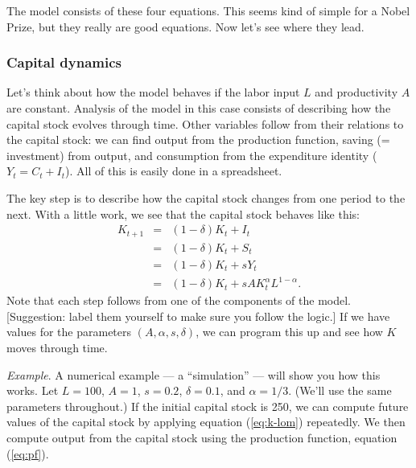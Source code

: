 \documentclass[letterpaper,12pt]{article}
\begin{document}
The model consists of these four equations.
This seems kind of simple for a Nobel Prize, but they really are good equations.
Now let's see where they lead.


\subsubsection*{Capital dynamics}
%
Let's think about how the model behaves if the labor input $L$
and productivity $A$ are constant.
Analysis of the model in this case consists of describing
how the capital stock evolves through time.
Other variables follow from their relations to the capital stock:
we can find output from the production function,
saving (= investment) from output,
and consumption from the expenditure identity ($ Y_t = C_t + I_t$).
All of this is easily done in a spreadsheet.

The key step is to describe how the capital stock changes from one period to the next.
With a little work, we see that the capital stock behaves like this:
\begin{eqnarray}
    K_{t+1} &=& (1-\delta) K_t + I_t \nonumber \\
            &=& (1-\delta) K_t + S_t \nonumber  \\
            &=& (1-\delta) K_t + s Y_t \nonumber \\
            &=& (1-\delta) K_t + s A K_t^\alpha L^{1-\alpha} .
            \label{eq:k-lom}
\end{eqnarray}
Note that each step follows from one of the components of the model.
[Suggestion:  label them yourself
to make sure you follow the logic.]
If we have values for the parameters $(A,\alpha,s,\delta)$,
we can program this up and see how $K$ moves through time.


{\it Example\/}. A numerical example --- a ``simulation'' ---
will show you how this works.
Let $L = 100$, $ A = 1$, $s = 0.2$, $\delta = 0.1$, and $\alpha =
1/3$. (We'll use the same parameters throughout.) If the initial
capital stock is 250, we can compute future values of the capital
stock by applying equation (\ref{eq:k-lom}) repeatedly.
We then compute output from the capital
stock using the production function, equation (\ref{eq:pf}). 
\end{document}
